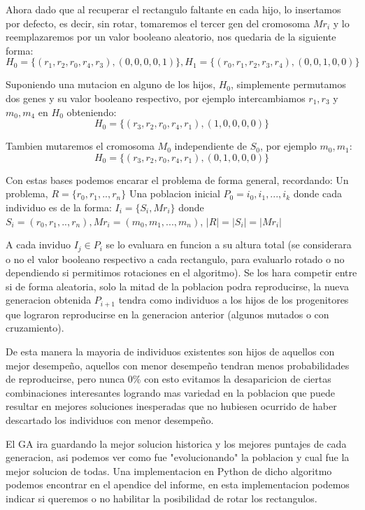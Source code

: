 \documentclass[10pt]{article}
\begin{document}
Ahora dado que al recuperar el rectangulo faltante en cada hijo, lo insertamos por defecto, es decir, sin rotar, tomaremos el tercer gen del cromosoma $Mr_i$ y lo reemplazaremos por un valor booleano aleatorio, nos quedaria de la siguiente forma:
$$H_0=\{(r_1,r_2,r_0,r_4,r_3),(0,0,0,0,1)\}, H_1 = \{(r_0,r_1,r_2,r_3,r_4),(0,0,1,0,0)\}$$

Suponiendo una mutacion en alguno de los hijos, $H_0$, simplemente permutamos dos genes y su valor booleano respectivo, por ejemplo intercambiamos $r_1,r_3$ y $m_0,m_4$ en $H_0$ obteniendo:
$$H_0=\{(r_3,r_2,r_0,r_4,r_1),(1,0,0,0,0)\}$$

Tambien mutaremos el cromosoma $M_0$ independiente de $S_0$, por ejemplo $m_0,m_1$:
$$H_0=\{(r_3,r_2,r_0,r_4,r_1),(0,1,0,0,0)\}$$

Con estas bases podemos encarar el problema de forma general, recordando: 
Un problema, $R = \{r_0,r_1,..,r_n\}$
Una poblacion inicial $P_0={i_0,i_1,...,i_k}$ donde cada individuo es de la forma:
$I_i = \{S_i,Mr_i\}$ donde $S_i = (r_0,r_1,..,r_n), Mr_i = (m_0, m_1,...,m_n)$, $|R| = |S_i| = |Mr_i|$

A cada inviduo $I_j \in P_i$ se lo evaluara en funcion a su altura total (se considerara o no el valor booleano respectivo a cada rectangulo, para evaluarlo rotado o no dependiendo si permitimos rotaciones en el algoritmo). Se los hara competir entre si de forma aleatoria, solo la mitad de la poblacion podra reproducirse, la nueva generacion obtenida $P_{i+1}$ tendra como individuos a los hijos de los progenitores que lograron reproducirse en la generacion anterior (algunos mutados o con cruzamiento). 

De esta manera la mayoria de individuos existentes son hijos de aquellos con mejor desempeño, aquellos con menor desempeño tendran menos probabilidades de reproducirse, pero nunca 0\% con esto evitamos la desaparicion de ciertas combinaciones interesantes logrando mas variedad en la poblacion que puede resultar en mejores soluciones inesperadas que no hubiesen ocurrido de haber descartado los individuos con menor desempeño.

El GA ira guardando la mejor solucion historica y los mejores puntajes de cada generacion, asi podemos ver como fue "evolucionando" la poblacion y cual fue la mejor solucion de todas. Una implementacion en Python de dicho algoritmo podemos encontrar en el apendice del informe, en esta implementacion podemos indicar si queremos o no habilitar la posibilidad de rotar los rectangulos.
\end{document}

